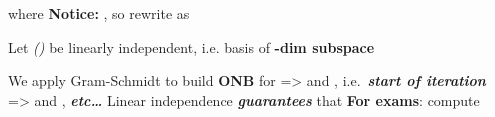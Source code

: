 \begin{itemize}
\begin{itemize}
                        \begin{itemize}

                              \vItem
                                    where
                                    \tcbbreak
                              \vItem
                                    \textbf{Notice:}
                                    ,
                                    so rewrite as
                        \end{itemize}
            \end{itemize}
      \vItem
            Let 
            \emph{()} be linearly independent, i.e. basis of
            \textbf{-dim subspace}

            \begin{itemize}

                  \vItem
                        We apply Gram-Schmidt to build \textbf{ONB}
                        for 
                  \vItem
                         =>
                         and
                        ,
                        i.e.~\textbf{\emph{start of iteration}}
                  \vItem
                         =>
                        and ,
                        \textbf{\emph{etc\ldots{}}}
                  \vItem
                        Linear independence \textbf{\emph{guarantees}} that
                  \vItem
                        \textbf{For exams}: compute 


\end{itemize}
\end{itemize}
